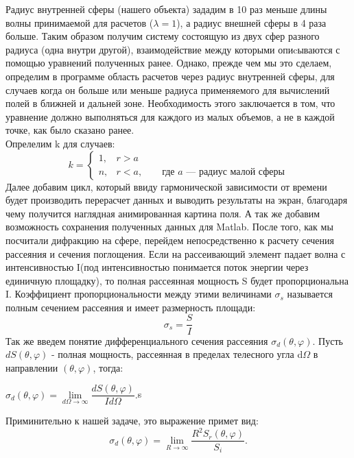 Радиус внутренней сферы (нашего объекта) зададим в 10 раз меньше длины волны принимаемой для расчетов ($ \lambda = 1 $), а радиус внешней сферы в 4 раза больше. Таким образом получим систему состоящую из двух сфер разного радиуса (одна внутри другой), взаимодействие между которыми опиcываются с помощью уравнений полученных ранее. Однако, прежде чем мы это сделаем, определим в программе область расчетов через радиус внутренней сферы, для случаев когда он больше или меньше радиуса применяемого для вычислений полей в ближней и дальней зоне. Необходимость этого заключается в том, что уравнение должно выполняться для каждого из малых объемов, а не в каждой точке, как было сказано ранее.
\\
Опрелелим k для случаев:
\begin{equation}
	k = 
	\begin{cases}
		1, & r > a\\
		n, & r < a ,\qquad \text{где }a \text{ --- радиус малой сферы}
	\end{cases}
\end{equation}
Далее добавим цикл, который ввиду гармонической зависимости от времени будет производить перерасчет данных и выводить результаты на экран, благодаря чему получится наглядная анимированная картина поля. А так же добавим возможность сохранения полученных данных для Matlab. После того, как мы посчитали дифракцию на сфере, перейдем непосредственно к расчету сечения рассеяния и сечения поглощения. Если на рассеивающий элемент падает волна с интенсивностью I(под интенсивностью понимается поток энергии через единичную площадку), то полная рассеянная мощность S будет пропорциональна I. Коэффициент пропорциональности между этими величинами $ \sigma_s $ называется полным сечением рассеяния и имеет размерность площади:
\begin{equation}
	\sigma_s = \dfrac{S}{I} 
\end{equation}
Так же введем понятие дифференциального сечения рассеяния
 $ \sigma_d(\theta,\varphi) $. Пусть $ dS(\theta, \varphi) $ - полная мощность, рассеянная в пределах телесного угла d$ \Omega $ в направлении $ (\theta,\varphi) $, тогда:
 \begin{center}
 	$ \sigma_d(\theta,\varphi) = \lim\limits_{d\Omega\rightarrow\infty} \dfrac{dS(\theta, \varphi)}{Id\Omega}. $s
 \end{center}
Приминительно к нашей задаче, это выражение примет вид:
\begin{equation}
\sigma_d(\theta,\varphi) = \lim\limits_{R\rightarrow\infty} \dfrac{R^2 S_r(\theta, \varphi)}{S_i}.
\end{equation}
